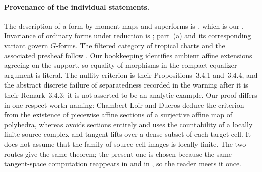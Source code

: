 \paragraph{Provenance of the individual statements.}
The description of a form by moment maps and superforms is
\cite[Proposition~15.1.1 and Corollary~15.1.2]{CLD25}, which is our
.  Invariance of ordinary forms under
reduction is \cite[Proposition~15.1.3(b) and the form variant immediately
following it]{CLD25}; part~(a) and its corresponding variant govern
$G$-forms.  The filtered category of tropical
charts and the associated presheaf follow \cite[\S3.3]{CLD25}.
Our bookkeeping identifies ambient affine extensions agreeing on the
support, so equality of morphisms in the compact equalizer argument
is literal.  The nullity
criterion  is their Propositions~3.4.1 and~3.4.4, and
the abstract discrete failure of separatedness recorded in the warning
after it is their Remark~3.4.3; it is not asserted to be an analytic example.
Our proof differs in one respect worth naming: Chambert-Loir
and Ducros deduce the criterion from the existence of piecewise affine
sections of a surjective affine map of polyhedra, whereas
 avoids sections entirely and
uses the countability of a locally finite source complex and tangent
lifts over a dense subset of each target cell.  It does not assume
that the family of source-cell images is locally finite.  The
two routes give the same theorem; the present one is chosen because the
same tangent-space computation reappears in
 and in
, so the reader meets it once.

